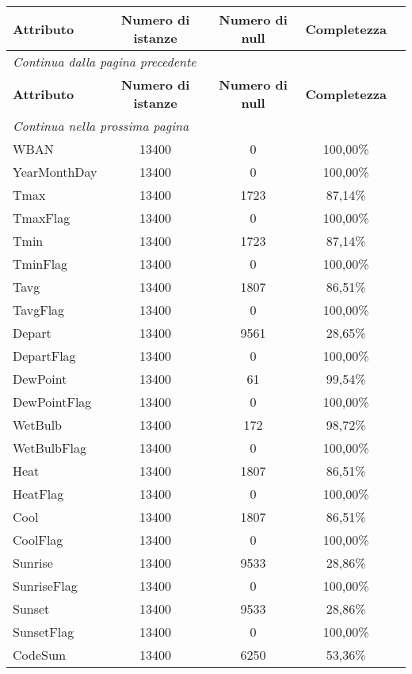 	\begin{longtable}{lcccc}
		\toprule
		\textbf{Attributo} \quad & \textbf{Numero di istanze} & \textbf{Numero di null} & \textbf{Completezza} \\
		\midrule
		\endfirsthead
		\multicolumn{5}{l}{\footnotesize\itshape Continua dalla pagina precedente} \\
		\toprule
		\textbf{Attributo} \quad & \textbf{Numero di istanze} & \textbf{Numero di null} & \textbf{Completezza} \\
		\midrule			
		\endhead
		\multicolumn{5}{l}{\footnotesize\itshape Continua nella prossima pagina} \\
		\endfoot
		\endlastfoot
		WBAN			& 13400 & 0		 	 & 100,00\%  	\\	
		YearMonthDay	& 13400 & 0		 	 & 100,00\%  	\\	
		Tmax			& 13400 & 1723	     & 87,14\%  	\\
		TmaxFlag		& 13400 & 0		     & 100,00\% 	\\	
		Tmin			& 13400 & 1723	     & 87,14\%  	\\
		TminFlag		& 13400 & 0		     & 100,00\% 	\\	
		Tavg			& 13400 & 1807	     & 86,51\%  	\\
		TavgFlag		& 13400 & 0		     & 100,00\% 	\\	
		Depart			& 13400 & 9561	     & 28,65\%  	\\
		DepartFlag		& 13400 & 0		     & 100,00\% 	\\	
		DewPoint		& 13400 & 61	   	 & 99,54\%  	\\
		DewPointFlag	& 13400 & 0		     & 100,00\% 	\\		
		WetBulb			& 13400 & 172	     & 98,72\%  	\\
		WetBulbFlag		& 13400 & 0		     & 100,00\% 	\\	
		Heat			& 13400 & 1807	     & 86,51\%  	\\
		HeatFlag		& 13400 & 0		     & 100,00\% 	\\	
		Cool			& 13400 & 1807	     & 86,51\%  	\\
		CoolFlag		& 13400 & 0		     & 100,00\% 	\\	
		Sunrise			& 13400 & 9533	     & 28,86\%  	\\
		SunriseFlag		& 13400 & 0		     & 100,00\% 	\\	
		Sunset			& 13400 & 9533	     & 28,86\%  	\\
		SunsetFlag		& 13400 & 0		     & 100,00\% 	\\	
		CodeSum			& 13400 & 6250	     & 53,36\%  	\\

\end{longtable}
